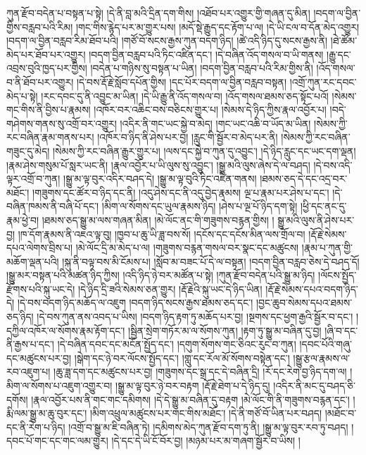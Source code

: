 ཀུན་རྫོབ་བདེན་པ་བསྟན་པ་སྟེ། །དེ་ནི་བླ་མའི་དྲིན་དག་གིས། །འཐོབ་པར་འགྱུར་གྱི་གཞན་དུ་མིན། །བདག་ལ་བྱིན་གྱིས་བརླབ་པའི་རིམ། །གང་གིས་རྙེད་པར་མ་གྱུར་པས། །མདོ་སྡེ་རྒྱུད་དང་རྟོག་པ་ལ། །དེ་ཡི་ངལ་བ་དོན་མེད་འགྱུར། །བདག་ལ་བྱིན་བརླབ་རིམ་ཐོབ་པའི། །གཙོ་བོ་སངས་རྒྱས་ཀུན་བདག་ཉིད། །ཚེ་འདི་ཉིད་དུ་སངས་རྒྱས་ནི། །ཐེ་ཚོམ་མེད་པར་ཐོབ་པར་འགྱུར། །བདག་བྱིན་བརླབ་པའི་ཏིང་འཛིན་དང་། །དེ་བཞིན་འོད་གསལ་བ་ཡི་གནས། །རྒྱུ་དང་འབྲས་བུའི་ཁྱད་པར་གྱིས། །བདེན་པ་གཉིས་སུ་བསྟན་པ་ཡིན། །བདག་བྱིན་བརླབ་པའི་རིམ་གྱིས་ནི། །འོད་གསལ་བ་ནི་ཐོབ་པར་འགྱུར། །དེ་བས་རྡོ་རྗེ་སློབ་དཔོན་གྱིས། །དང་པོར་བདག་ལ་བྱིན་བརླབ་བསྟན། །འགྲོ་ཀུན་རང་དབང་མེད་པ་སྟེ། །རང་དབང་དུ་ནི་འབྱུང་མ་ཡིན། །དེ་ཡི་རྒྱུ་ནི་འོད་གསལ་བ། །འོད་གསལ་ཐམས་ཅད་སྟོང་པའོ། །སེམས་གང་གིས་ནི་བྱིས་པ་རྣམས། །འཁོར་བར་འཆིང་བས་བཅིངས་གྱུར་པ། །སེམས་དེ་ཉིད་ཀྱིས་རྣལ་འབྱོར་པ། །བདེ་གཤེགས་གནས་སུ་འགྲོ་བར་འགྱུར། །འདིར་ནི་གང་ཡང་སྐྱེ་བ་མེད། །གང་ཡང་འཆི་བ་ཡོད་མ་ཡིན། །སེམས་ཀྱི་རང་བཞིན་རྣམ་གནས་པར། །འཁོར་བ་ཉིད་ནི་ཤེས་པར་བྱ། །རླུང་གི་སྦྱོར་བ་མེད་པར་ནི། །སེམས་ཀྱི་རང་བཞིན་གཟུང་དུ་མེད། །སེམས་ཀྱི་རང་བཞིན་རྒྱུར་གྱུར་པ། །ལས་དང་སྐྱེ་བ་ཀུན་དུ་འབྱུང་། །དེ་ཉིད་རླུང་དང་ཡང་དག་ལྡན། །རྣམ་ཤེས་གསུམ་པོ་སླར་ཡང་ནི། །རྣལ་འབྱོར་པ་ཡི་ལུས་སུ་འབྱུང་། །སྒྱུ་མའི་ལུས་ཞེས་དེ་ལ་བཤད། །དེ་བས་འདི་ལྟར་འགྲོ་བ་ཀུན། །སྒྱུ་མ་ལྟ་བུར་འདིར་བཤད་དེ། །སྒྱུ་མ་ལྟ་བུའི་ཏིང་འཛིན་གནས། །ཐམས་ཅད་དེ་དང་འདྲ་བར་མཐོང་། །གཟུགས་དང་ཚོར་བ་ཉིད་དང་ནི། །འདུ་ཤེས་དང་ནི་འདུ་བྱེད་རྣམས། ལྔ་པ་རྣམ་པར་ཤེས་པ་དང་། །དེ་བཞིན་ཁམས་ནི་བཞི་པོ་དང་། །མིག་ལ་སོགས་དང་ཡུལ་རྣམས་ཉིད། །ཤེས་པ་ལྔ་པོ་ཉིད་དག་སྟེ། །ཕྱི་དང་ནང་དུ་རྣམ་ཕྱེ་བ། །ཐམས་ཅད་སྒྱུ་མ་ལས་གཞན་མིན། །མེ་ལོང་ནང་གི་གཟུགས་བརྙན་གྱིས། །
སྒྱུ་མའི་ལུས་ནི་ཤེས་པར་བྱ། །ཁ་དོག་རྣམས་ནི་འཇའ་ལྟ་བུ། །ཁྱབ་པ་ཆུ་ཡི་ཟླ་བས་སོ། །དངོས་དང་དངོས་མིན་ལས་གྲོལ་བ། །རྡོ་རྗེ་སེམས་དཔའ་ལེགས་བྲིས་པ། །མེ་ལོང་དྲི་མ་མེད་པ་ལ། །གཟུགས་བརྙན་གསལ་བར་སྣང་དང་མཚུངས། །རྣམ་པ་ཀུན་གྱི་མཆོག་ལྡན་པའི། །སྐུ་ནི་བལྟ་བས་མི་ངོམས་པ། །སློབ་མ་བཟང་པོ་དེ་ལ་བསྟན། །བདག་བྱིན་བརླབ་ཅེས་དེ་བཤད་དོ། །སྒྱུ་མར་བསྟན་པའི་མཚན་ཉིད་ཀྱིས། །འདི་ཉིད་ཉེ་བར་མཚོན་པ་སྟེ། །ཀུན་རྫོབ་བདེན་པའི་སྒྱུ་མ་ཉིད། །ལོངས་སྤྱོད་རྫོགས་པའི་སྐུ་ཡང་དེ། །དེ་ཉིད་དྲི་ཟའི་སེམས་ཅན་གྱུར། །རྡོ་རྗེའི་སྐུ་ཡང་དེ་ཉིད་ཡིན། །རྡོ་རྗེ་སེམས་དཔའ་བདག་ཉིད་དེ། །དེ་བས་བདག་ཉིད་མཆོད་ལ་འཇུག །བདག་ཉིད་སངས་རྒྱས་ཐམས་ཅད་དང་། །བྱང་ཆུབ་སེམས་དཔའ་ཐམས་ཅད་ཉིད། །དེ་བས་ཀུན་ནས་འབད་པ་ཡིས། །བདག་ཉིད་རྟག་ཏུ་མཆོད་པར་བྱ། །སྔགས་དང་ཕྱག་རྒྱའི་སྦྱོར་བ་དང་། །དཀྱིལ་འཁོར་ལ་སོགས་རྣམ་རྟོག་དང་། །སྦྱིན་སྲེག་གཏོར་མ་ལ་སོགས་ཀུན། །རྟག་ཏུ་སྒྱུ་མ་བཞིན་དུ་བྱ། །ཞི་བ་དང་ནི་རྒྱས་པ་དང་། །དེ་བཞིན་དབང་དང་མངོན་སྤྱོད་དང་། །དགུག་སོགས་གང་ཅིའང་རུང་བ་ཀུན། །དབང་པོའི་གཞུ་དང་མཚུངས་པར་བྱ། །སྒེག་དང་ཉེ་བར་ལོངས་སྤྱོད་དང་། །གླུ་དང་རོལ་མོ་སོགས་བསྟེན་དང་། །སྒྱུ་རྩལ་རྣམས་ལ་རབ་འཇུག་པ། །ཆུ་ཟླ་དག་དང་མཚུངས་པར་བྱ། །གཟུགས་དང་སྒྲ་དང་དེ་བཞིན་དྲི། །རོ་དང་རེག་བྱ་ཉིད་དག་ལ། །མིག་ལ་སོགས་པ་འཇུག་འགྱུར་བ། །སྒྱུ་མ་ལྟ་བུར་ཉེ་བར་བརྟག །རྡོ་རྗེ་ཐེག་པ་དེ་ཉིད་དུ། །འདིར་ནི་མང་དུ་བཤད་ཅི་དགོས། །རྣལ་འབྱོར་པས་ནི་གང་གང་དམིགས། །དེ་དེ་སྒྱུ་མ་བཞིན་དུ་བརྟག །མེ་ལོང་གི་ནི་གཟུགས་བརྙན་དང་། །རྨི་ལམ་སྒྱུ་མ་ཆུ་བུར་དང་། །མིག་འཕྲུལ་མཚུངས་པར་གང་གིས་མཐོང་། །དེ་ནི་གཙོ་བོ་ཡིན་པར་བཤད། །མཐོང་བ་དང་ནི་རེག་པ་ཉིད། །འགྲོ་བ་སྒྱུ་མ་ཇི་བཞིན་ཏེ། །དམིགས་མེད་ཀུན་རྫོབ་དག་ཏུ་ནི། །སྒྱུ་མ་ལྟ་བུར་རབ་ཏུ་བཤད། །དབང་པོ་གང་དང་གང་ལམ་གྱུར། །དེ་དང་དེ་ཡི་ངོ་བོར་བྱ། །མཉམ་པར་མ་གཞག་སྦྱོར་བ་ཡིས། །
